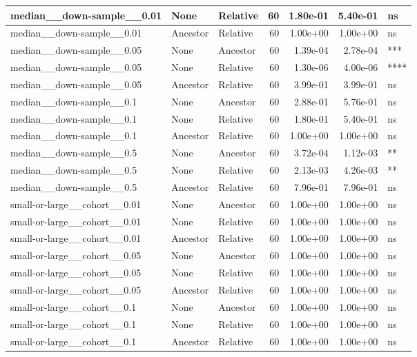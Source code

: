 \documentclass[
]{book}
\begin{document}
\begin{tabular}{l|l|l|r|r|r|l}
\hline
median\_\_down-sample\_\_0.01 & None & Relative & 60 & 1.80e-01 & 5.40e-01 & ns\\
\hline
median\_\_down-sample\_\_0.01 & Ancestor & Relative & 60 & 1.00e+00 & 1.00e+00 & ns\\
\hline
median\_\_down-sample\_\_0.05 & None & Ancestor & 60 & 1.39e-04 & 2.78e-04 & ***\\
\hline
median\_\_down-sample\_\_0.05 & None & Relative & 60 & 1.30e-06 & 4.00e-06 & ****\\
\hline
median\_\_down-sample\_\_0.05 & Ancestor & Relative & 60 & 3.99e-01 & 3.99e-01 & ns\\
\hline
median\_\_down-sample\_\_0.1 & None & Ancestor & 60 & 2.88e-01 & 5.76e-01 & ns\\
\hline
median\_\_down-sample\_\_0.1 & None & Relative & 60 & 1.80e-01 & 5.40e-01 & ns\\
\hline
median\_\_down-sample\_\_0.1 & Ancestor & Relative & 60 & 1.00e+00 & 1.00e+00 & ns\\
\hline
median\_\_down-sample\_\_0.5 & None & Ancestor & 60 & 3.72e-04 & 1.12e-03 & **\\
\hline
median\_\_down-sample\_\_0.5 & None & Relative & 60 & 2.13e-03 & 4.26e-03 & **\\
\hline
median\_\_down-sample\_\_0.5 & Ancestor & Relative & 60 & 7.96e-01 & 7.96e-01 & ns\\
\hline
small-or-large\_\_cohort\_\_0.01 & None & Ancestor & 60 & 1.00e+00 & 1.00e+00 & ns\\
\hline
small-or-large\_\_cohort\_\_0.01 & None & Relative & 60 & 1.00e+00 & 1.00e+00 & ns\\
\hline
small-or-large\_\_cohort\_\_0.01 & Ancestor & Relative & 60 & 1.00e+00 & 1.00e+00 & ns\\
\hline
small-or-large\_\_cohort\_\_0.05 & None & Ancestor & 60 & 1.00e+00 & 1.00e+00 & ns\\
\hline
small-or-large\_\_cohort\_\_0.05 & None & Relative & 60 & 1.00e+00 & 1.00e+00 & ns\\
\hline
small-or-large\_\_cohort\_\_0.05 & Ancestor & Relative & 60 & 1.00e+00 & 1.00e+00 & ns\\
\hline
small-or-large\_\_cohort\_\_0.1 & None & Ancestor & 60 & 1.00e+00 & 1.00e+00 & ns\\
\hline
small-or-large\_\_cohort\_\_0.1 & None & Relative & 60 & 1.00e+00 & 1.00e+00 & ns\\
\hline
small-or-large\_\_cohort\_\_0.1 & Ancestor & Relative & 60 & 1.00e+00 & 1.00e+00 & ns\\

\end{tabular}
\end{document}
